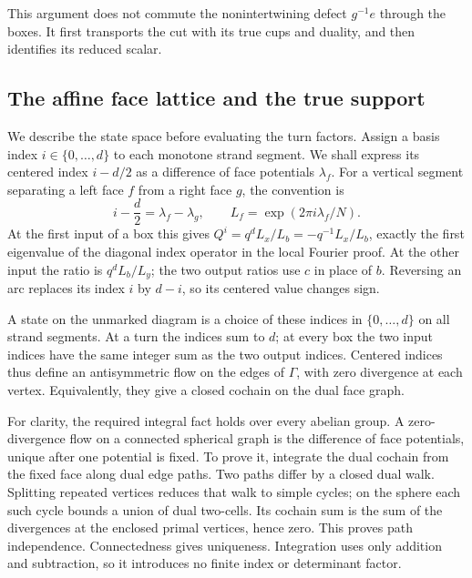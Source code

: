 This argument does not commute the nonintertwining defect
\(g^{-1}e\) through the boxes. It first transports the cut with
its true cups and duality, and then identifies its reduced scalar.

\subsection{The affine face lattice and the true support}

We describe the state space before evaluating the turn factors.
Assign a basis index \(i\in\{0,\ldots,d\}\) to each monotone strand
segment. We shall express its centered index \(i-d/2\) as a difference
of face potentials \(\lambda_f\). For a vertical segment separating
a left face \(f\) from a right face \(g\), the convention is
\begin{equation}\label{de:centered-flow}
 i-\frac d2=\lambda_f-\lambda_g,\qquad
 L_f=\exp(2\pi i\lambda_f/N).
\end{equation}
At the first input of a box this gives
\(Q^i=q^dL_x/L_b=-q^{-1}L_x/L_b\), exactly the first
eigenvalue of the diagonal index operator in the local Fourier proof. At the other input the ratio
is \(q^dL_b/L_y\); the two output ratios use \(c\) in place of
\(b\). Reversing an arc replaces its index \(i\) by \(d-i\),
so its centered value changes sign.

A state on the unmarked diagram is a choice of these indices in
\(\{0,\ldots,d\}\) on all strand segments. At a turn the indices sum to \(d\); at every
box the two input indices have the same integer sum as the two
output indices. Centered indices thus define an antisymmetric flow
on the edges of \(\Gamma\), with zero divergence at each vertex.
Equivalently, they give a closed cochain on the dual face graph.

For clarity, the required integral fact holds over every
abelian group. A zero-divergence flow on a connected spherical
graph is the difference of face potentials, unique after one
potential is fixed. To prove it, integrate the dual cochain from
the fixed face along dual edge paths. Two paths differ by a
closed dual walk. Splitting repeated vertices reduces that walk
to simple cycles; on the sphere each such cycle bounds a union
of dual two-cells. Its cochain sum is the sum of the divergences
at the enclosed primal vertices, hence zero. This proves
path independence. Connectedness gives uniqueness. Integration
uses only addition and subtraction, so it introduces no finite
index or determinant factor.

